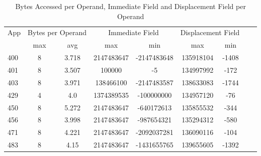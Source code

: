 \begin{Solution}
\begin{table}[H]
    \centering
    \caption{Bytes Accessed per Operand, Immediate Field and Displacement Field per Operand}
    \label{tab:pD:stats_op}
    \begin{tabular}{| l | c | c | c | c | c | c | c | c |}
        \hline
        \multirow{2}{*}{App} & \multicolumn{2}{c|}{Bytes per Operand} & \multicolumn{2}{c|}{Immediate Field} & \multicolumn{2}{c|}{Displacement Field} \\
        \cline{2-3}\cline{4-5}\cline{6-7}
        & max & avg & max & min & max & min \\
        \hline
        400 & 8 & 3.718 & 2147483647 & -2147483648 & 135918104 & -1408 \\
        \hline
        401 & 8 & 3.507 & 100000 & -5 & 134997992 & -172 \\
        \hline
        403 & 8 & 3.971 & 138466100 & -2147483587 & 138633083 & -1744 \\
        \hline
        429 & 4 & 4.0 & 1374389535 & -100000000 & 134957120 & -76 \\
        \hline
        450 & 8 & 5.272 & 2147483647 & -640172613 & 135855532 & -344 \\
        \hline
        456 & 8 & 3.998 & 2147483647 & -987654321 & 135294312 & -580 \\
        \hline
        471 & 8 & 4.221 & 2147483647 & -2092037281 & 136090116 & -104 \\
        \hline
        483 & 8 & 4.15 & 2147483647 & -1431655765 & 139655605 & -1392 \\
        \hline
    \end{tabular}
\end{table}

\end{Solution}